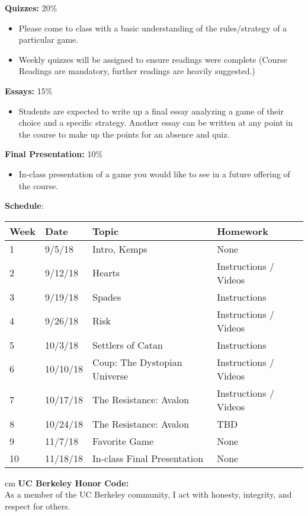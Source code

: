 \documentclass[11.5pt]{article}
\begin{document}
\begin{description}
\item \textbf{Quizzes:} 20\% 
\end{description}

\begin{itemize}
\item Please come to class with a basic understanding of the rules/strategy of a
particular game. 
\item Weekly quizzes will be assigned to ensure readings were complete (Course
Readings are mandatory, further readings are heavily suggested.)
\end{itemize}

\begin{description}
\item \textbf{Essays:} 15\% 
\end{description}

\begin{itemize}
\item Students are expected to write up a final essay analyzing a game of their choice and a specific strategy. Another essay can be written at any point in the course to make up the points for an absence and quiz.
\end{itemize}

\begin{description}
\item \textbf{Final Presentation:} 10\% 
\end{description}

\begin{itemize}
\item In-class presentation of a game you would like to see in a future offering of the course.
\end{itemize}
\newpage

\noindent\textbf{\large Schedule}: \vspace*{0.05cm}
\flushleft
\begin{tabular}{ |p{0.8cm}||p{3cm}|p{7cm}|p{4cm}|  }
 \hline
 Week & Date & Topic & Homework \\
 \hline
1  & 9/5/18 & Intro, Kemps & None \\ \hline
2 &  9/12/18  & Hearts & Instructions / Videos \\ \hline
3 & 9/19/18 & Spades & Instructions \\ \hline
4 & 9/26/18  & Risk & Instructions / Videos \\ \hline
5 & 10/3/18 & Settlers of Catan & Instructions \\ \hline
6 & 10/10/18 & Coup: The Dystopian Universe & Instructions / Videos \\ \hline
7 & 10/17/18 & The Resistance: Avalon & Instructions / Videos \\ \hline
8 & 10/24/18 & The Resistance: Avalon & TBD \\ \hline
9 & 11/7/18 & Favorite Game & None \\ \hline
10 & 11/18/18 & In-class Final Presentation & None \\
\hline
\end{tabular}
 cm
\noindent\textbf{UC Berkeley Honor Code:} \\
As a member of the UC Berkeley community, I act with honesty, integrity, and respect for others.
\end{document}
